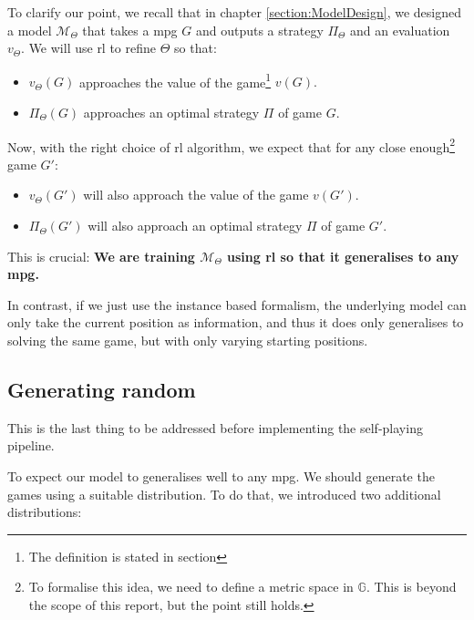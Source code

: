 	To clarify our point, we recall that in chapter \ref{section:ModelDesign}, we designed a model $\mathcal{M}_\Theta$ that takes a \acrshort{mpg} $G$ and outputs a strategy $\Pi_\Theta$ and an evaluation $v_\Theta.$ We will use \acrshort{rl} to refine $\Theta$ so that: 
	\begin{itemize}
		\item $v_\Theta(G)$ approaches the value of the game\footnote{The definition is stated in section} $v(G).$
		\item $\Pi_\Theta(G)$ approaches an optimal strategy $\Pi$ of game $G.$
	\end{itemize}
	Now, with the right choice of \acrshort{rl} algorithm, we expect that for any close enough\footnote{To formalise this idea, we need to define a metric space in $\mathbb{G}.$ This is beyond the scope of this report, but the point still holds.} game $G':$
	\begin{itemize}
		\item $v_\Theta(G')$ will also approach the value of the game $v(G').$
		\item $\Pi_\Theta(G')$ will also approach an optimal strategy $\Pi$ of game $G'.$
	\end{itemize}
	This is crucial: \textbf{We are training $\mathcal{M}_{\Theta}$ using \acrshort{rl} so that it generalises to any \acrshort{mpg}.}
	
	In contrast, if we just use the instance based formalism, the underlying model can only take the current position as information, and thus it does only generalises to solving the same game, but with only varying starting positions.
	\subsection{Generating random }
	This is the last thing to be addressed before implementing the self-playing pipeline.
	
	To expect our model to generalises well to any \acrshort{mpg}. We should generate the games using a suitable distribution. To do that, we introduced two additional distributions:
